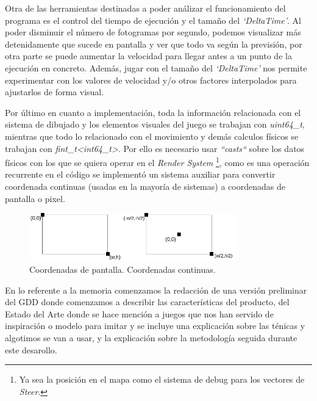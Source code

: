 Otra de las herramientas destinadas a poder análizar el funcionamiento del programa es
el control del tiempo de ejecución y el tamaño del \textit{`DeltaTime'}. Al poder disminuir
el número de fotogramas por segundo, podemos visualizar más detenidamente que sucede en
pantalla y ver que todo va según la previsión, por otra parte se puede aumentar la velocidad
para llegar antes a un punto de la ejecución en concreto. Además, jugar con el tamaño del
\textit{`DeltaTime'} nos permite experimentar con los valores de velocidad y/o otros factores
interpolados para ajustarlos de forma visual. 

Por último en cuanto a implementación, toda la información relacionada con el sistema de 
dibujado y los elementos visuales del juego se trabajan con \textit{uint64\_t}, mientras que
todo lo relacionado con el movimiento y demás calculos físicos se trabajan con
\textit{fint\_t\textless int64\_t\textgreater}. Por ello es necesario usar \textit{``casts``}
sobre los datos físicos con los que se quiera operar en el \textit{Render System}
\footnote{Ya sea la posición en el mapa como el sistema de debug para los vectores de
\textit{Steer}.}, como es una operación recurrente en el código se implementó un sistema 
auxiliar para convertir coordenada continuas (usadas en la mayoría de sistemas) a coordenadas de 
pantalla o pixel. 

\begin{figure}[ht]
\centering
\includegraphics[width=0.8\textwidth]{imagenes/diario_desarrollo/sis_coords.png}\\
\hspace{-8mm} Coordenadas de pantalla. \hspace{16mm}  Coordenadas continuas.
\label{fig:sis_coords}
\end{figure} 

En lo referente a la memoria comenzamos la redacción de una versión preliminar del \ac{GDD}
donde comenzamos a describir las características del producto, del Estado del Arte donde se hace
mención a juegos que nos han servido de inspiración o modelo para imitar y se incluye una explicación
sobre las ténicas y algotimos se van a usar, y la explicación sobre la metodología seguida durante
este desarollo. 

